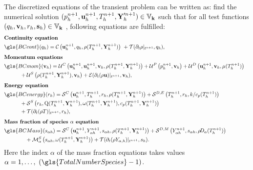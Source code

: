 The discretized equations of the transient problem can be written as: find the numerical solution $(p^{n+1}_h,\textbf{u}^{n+1}_h, T^{n+1}_h, \textbf{Y}'^{n+1}_h) \in \mathbb{V}_{\textbf{k}}$ such that for all test functions $(q_h,\textbf{v}_h, r_h, \mathbf{s}_h) \in \mathbb{V}_{\textbf{k}}$ , following equations are fulfilled:
\begin{subequations}
	\begin{flalign}%
		&\textbf{Continuity equation}& \notag \\
		&\gls{BCcont}(q_h)= \ContDis\ + \mathcal{T}(\partial_t \rho|_{t^{n+1}},q_h ) ,& \label{DiscretizedConti}\\[1ex]
		&\textbf{Momentum equations}& \notag \\
		&\gls{BCmom}(\vec{v}_h) =	\MomConv + \MomPres + \MomDiff & \notag\\
		& \quad\quad\quad + \MomSource + \mathcal{E}(\partial_t (\rho \vec{u})|_{t^{n+1}},\vec{v}_h ) ,& \label{DiscretizedMomentum}\\[1ex]
		&\textbf{Energy equation}& \notag \\
		&\gls{BCenergy}(r_h)
		 = \mathcal{S}^C\left(\vec{u}^{n+1}_h,T^{n+1}_h,r_h, \rhoh\right) + \mathcal{S}^{D,E}\left(T^{n+1}_h,r_h,k/c_p(T^{n+1}_h)\right)&  \notag\\
		& \quad\quad\quad + \mathcal{S}^S\left(r_h, \heatRelease(T^{n+1}_h,\vec{Y}^{n+1}_h), \rateReac(T^{n+1}_h,\vec{Y}^{n+1}_h),\cph\right)&\notag\\
		&\quad\quad\quad+ \mathcal{T}(\partial_t (\rho T)|_{t^{n+1}},r_h ),& \label{DiscretizedEnergy}   \\[1ex]
		&\textbf{Mass fraction of species $\alpha$ equation}& \notag \\
		&\gls{BCMass}(s_{\alpha h})= \mathcal{S}^C\left(\vec{u}^{n+1}_h,\Yi, s_{\alpha h}, \rhoh\right) + \mathcal{S}^{D,M}\left(\Yi,s_{\alpha h},\rhodh\right)&  \notag \\
		& \quad\quad\quad\quad + \mathcal{M}^S_\alpha\left(s_{\alpha h},\rateReac(T^{n+1}_h,\vec{Y}^{n+1}_h )\right) + \mathcal{T}(\partial_t (\rho Y_{\alpha,h})|_{t^{n+1}},s_h ).& \label{DiscretizedMassFractions}
	\end{flalign}\label{eqs:variatProblemFull}
\end{subequations}
Here the index $\alpha$ of the mass fraction equations takes values $\alpha = 1, \dots,~(\gls{TotalNumberSpecies} - 1)$.
